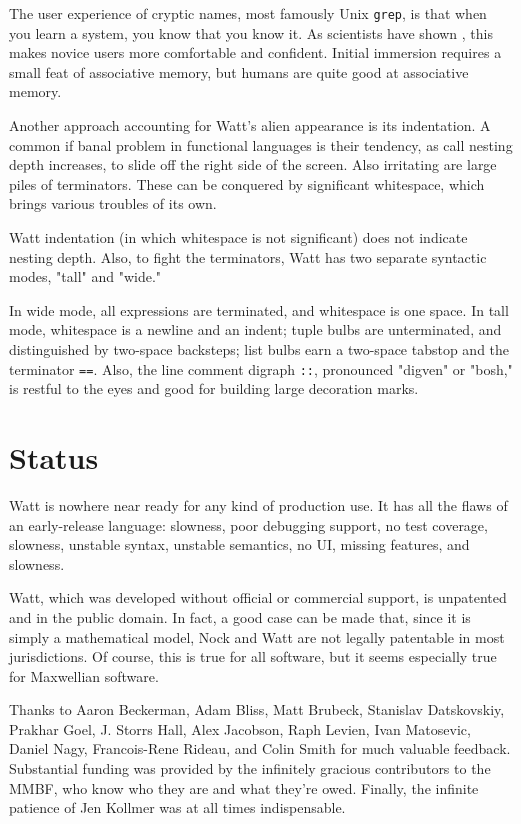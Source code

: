 \documentclass[10pt, nocopyrightspace]{sigplanconf}
\begin{document}
The user experience of cryptic names, most famously Unix
\verb|grep|, is that when you learn a system, you know that you
know it.  As scientists have shown \citep{unixtrouble},
this makes novice users more comfortable and confident.  Initial
immersion requires a small feat of associative memory, but humans
are quite good at associative memory.

Another approach accounting for Watt's alien appearance is its
indentation.  A common if banal problem in functional languages
is their tendency, as call nesting depth increases, to slide off
the right side of the screen.  Also irritating are large piles of
terminators.  These can be conquered by significant whitespace,
which brings various troubles of its own.

Watt indentation (in which whitespace is not significant) does
not indicate nesting depth.  Also, to fight the terminators, Watt
has two separate syntactic modes, "tall" and "wide."  

In wide
mode, all expressions are terminated, and whitespace is one
space.  In tall mode, whitespace is a newline and an indent;
tuple bulbs are unterminated, and distinguished by two-space
backsteps; list bulbs earn a two-space tabstop and the terminator
\verb|==|.  Also, the line comment digraph \verb|::|, pronounced
"digven" or "bosh," is restful to the eyes and good for building
large decoration marks.

\section{Status}

Watt is nowhere near ready for any kind of production use.  It
has all the flaws of an early-release language: slowness, poor
debugging support, no test coverage, slowness, unstable syntax,
unstable semantics, no UI, missing features, and slowness.

Watt, which was developed without official or commercial support,
is unpatented and in the public domain.  In fact, a good case can
be made that, since it is simply a mathematical model, Nock and
Watt are not legally patentable in most jurisdictions.  Of
course, this is true for all software, but it seems especially
true for Maxwellian software.

\acks

Thanks to Aaron Beckerman, Adam Bliss, Matt Brubeck, Stanislav
Datskovskiy, Prakhar Goel, J. Storrs Hall, Alex Jacobson, Raph
Levien, Ivan Matosevic, Daniel Nagy, Francois-Rene Rideau, and
Colin Smith for much valuable feedback.  Substantial funding was
provided by the infinitely gracious contributors to the MMBF, who
know who they are and what they're owed.  Finally, the infinite
patience of Jen Kollmer was at all times indispensable.






\end{document}
